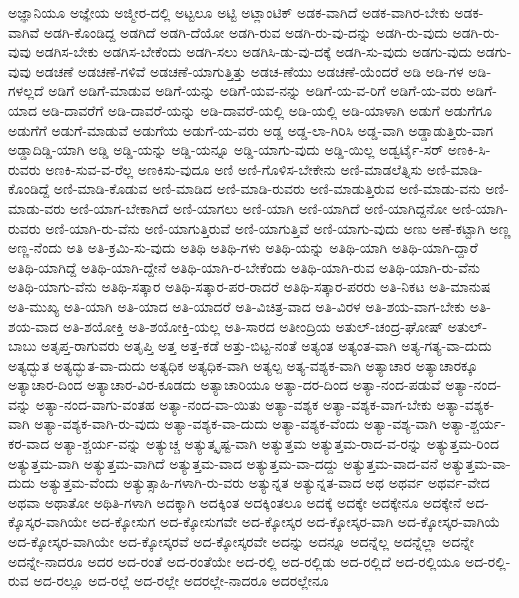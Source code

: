 {ಅಜ್ಞಾನಿಯೂ
ಅಜ್ಞೇಯ
ಅಜ್ಮೀರ-ದಲ್ಲಿ
ಅಟ್ಟಲೂ
ಅಟ್ಟಿ
ಅಟ್ಲಾಂಟಿಕ್
ಅಡಕ-ವಾಗಿದೆ
ಅಡಕ-ವಾಗಿರ-ಬೇಕು
ಅಡಕ-ವಾಗಿವೆ
ಅಡಗಿ-ಕೊಂಡಿದ್ದ
ಅಡಗಿದೆ
ಅಡಗಿ-ದೆಯೋ
ಅಡಗಿ-ರುವ
ಅಡಗಿ-ರು-ವು-ದನ್ನು
ಅಡಗಿ-ರು-ವುದು
ಅಡಗಿ-ರು-ವುವು
ಅಡಗಿಸ-ಬೇಕು
ಅಡಗಿಸ-ಬೇಕೆಂದು
ಅಡಗಿ-ಸಲು
ಅಡಗಿಸಿ-ಡು-ವು-ದಕ್ಕೆ
ಅಡಗಿ-ಸು-ವುದು
ಅಡಗು-ವುದು
ಅಡಗು-ವುವು
ಅಡಚಣೆ
ಅಡಚಣೆ-ಗಳಿವೆ
ಅಡಚಣೆ-ಯಾಗುತ್ತಿತ್ತು
ಅಡಚ-ಣೆಯು
ಅಡಚಣೆ-ಯೆಂದರೆ
ಅಡಿ
ಅಡಿ-ಗಳ
ಅಡಿ-ಗಳಲ್ಲದೆ
ಅಡಿಗೆ
ಅಡಿಗೆ-ಮಾಡುವ
ಅಡಿಗೆ-ಯನ್ನು
ಅಡಿಗೆ-ಯವ-ನನ್ನು
ಅಡಿಗೆ-ಯ-ವ-ರಿಗೆ
ಅಡಿಗೆ-ಯ-ವರು
ಅಡಿಗೆ-ಯಾದ
ಅಡಿ-ದಾವರೆಗೆ
ಅಡಿ-ದಾವರೆ-ಯನ್ನು
ಅಡಿ-ದಾವರೆ-ಯಲ್ಲಿ
ಅಡಿ-ಯಲ್ಲಿ
ಅಡಿ-ಯಾಳಾಗಿ
ಅಡುಗೆ
ಅಡುಗೆಗೂ
ಅಡುಗೆಗೆ
ಅಡುಗೆ-ಮಾಡುವೆ
ಅಡುಗೆಯ
ಅಡುಗೆ-ಯ-ವರು
ಅಡ್ಡ
ಅಡ್ಡ-ಲಾ-ಗಿರಿಸಿ
ಅಡ್ಡ-ವಾಗಿ
ಅಡ್ಡಾಡುತ್ತಿರು-ವಾಗ
ಅಡ್ಡಾದಿಡ್ಡಿ-ಯಾಗಿ
ಅಡ್ಡಿ
ಅಡ್ಡಿ-ಯನ್ನು
ಅಡ್ಡಿ-ಯನ್ನೂ
ಅಡ್ಡಿ-ಯಾಗು-ವುದು
ಅಡ್ಡಿ-ಯಿಲ್ಲ
ಅಡ್ವರ್ಟೈ-ಸರ್
ಅಣಕಿ-ಸಿ-ರುವರು
ಅಣಕಿ-ಸುವ-ವ-ರೆಲ್ಲ
ಅಣಕಿಸು-ವುದೂ
ಅಣಿ
ಅಣಿ-ಗೊಳಿಸ-ಬೇಕೇನು
ಅಣಿ-ಮಾಡಲೆತ್ನಿಸು
ಅಣಿ-ಮಾಡಿ-ಕೊಂಡಿದ್ದೆ
ಅಣಿ-ಮಾಡಿ-ಕೊಡುವ
ಅಣಿ-ಮಾಡಿದ
ಅಣಿ-ಮಾಡಿ-ರುವರು
ಅಣಿ-ಮಾಡುತ್ತಿರುವ
ಅಣಿ-ಮಾಡು-ವನು
ಅಣಿ-ಮಾಡು-ವರು
ಅಣಿ-ಯಾಗ-ಬೇಕಾಗಿದೆ
ಅಣಿ-ಯಾಗಲು
ಅಣಿ-ಯಾಗಿ
ಅಣಿ-ಯಾಗಿದೆ
ಅಣಿ-ಯಾಗಿದ್ದನೋ
ಅಣಿ-ಯಾಗಿ-ರುವರು
ಅಣಿ-ಯಾಗಿ-ರು-ವೆನು
ಅಣಿ-ಯಾಗುತ್ತಿರುವೆ
ಅಣಿ-ಯಾಗುತ್ತಿವೆ
ಅಣಿ-ಯಾಗು-ವುದು
ಅಣು
ಅಣೆ-ಕಟ್ಟಾಗಿ
ಅಣ್ಣ
ಅಣ್ಣ-ನೆಂದು
ಅತಿ
ಅತಿ-ಕ್ರಮಿ-ಸು-ವುದು
ಅತಿಥಿ
ಅತಿಥಿ-ಗಳು
ಅತಿಥಿ-ಯನ್ನು
ಅತಿಥಿ-ಯಾಗಿ
ಅತಿಥಿ-ಯಾಗಿ-ದ್ದಾರೆ
ಅತಿಥಿ-ಯಾಗಿದ್ದೆ
ಅತಿಥಿ-ಯಾಗಿ-ದ್ದೇನೆ
ಅತಿಥಿ-ಯಾಗಿ-ರ-ಬೇಕೆಂದು
ಅತಿಥಿ-ಯಾಗಿ-ರುವ
ಅತಿಥಿ-ಯಾಗಿ-ರು-ವೆನು
ಅತಿಥಿ-ಯಾಗು-ವೆನು
ಅತಿಥಿ-ಸತ್ಕಾರ
ಅತಿಥಿ-ಸತ್ಕಾರ-ಪರ-ರಾದರೆ
ಅತಿಥಿ-ಸತ್ಕಾರ-ಪರರು
ಅತಿ-ನಿಕಟ
ಅತಿ-ಮಾನುಷ
ಅತಿ-ಮುಖ್ಯ
ಅತಿ-ಯಾಗಿ
ಅತಿ-ಯಾದ
ಅತಿ-ಯಾದರೆ
ಅತಿ-ವಿಚಿತ್ರ-ವಾದ
ಅತಿ-ವಿರಳ
ಅತಿ-ಶಯ-ವಾಗ-ಬೇಕು
ಅತಿ-ಶಯ-ವಾದ
ಅತಿ-ಶಯೋಕ್ತಿ
ಅತಿ-ಶಯೋಕ್ತಿ-ಯಲ್ಲ
ಅತಿ-ಸಾರದ
ಅತೀಂದ್ರಿಯ
ಅತುಲ್‌-ಚಂದ್ರ-ಘೋಷ್
ಅತುಲ್‌-ಬಾಬು
ಅತೃಪ್ತ-ರಾಗುವರು
ಅತೃಪ್ತಿ
ಅತ್ತ
ಅತ್ತ-ಕಡೆ
ಅತ್ತು-ಬಿಟ್ಟ-ನಂತೆ
ಅತ್ಯಂತ
ಅತ್ಯಂತ-ವಾಗಿ
ಅತ್ಯ-ಗತ್ಯ-ವಾ-ದುದು
ಅತ್ಯದ್ಭುತ
ಅತ್ಯದ್ಭುತ-ವಾ-ದುದು
ಅತ್ಯಧಿಕ
ಅತ್ಯಧಿಕ-ವಾಗಿ
ಅತ್ಯಲ್ಪ
ಅತ್ಯ-ವಶ್ಯಕ-ವಾಗಿ
ಅತ್ಯಾಚಾರ
ಅತ್ಯಾಚಾರಕ್ಕೂ
ಅತ್ಯಾಚಾರ-ದಿಂದ
ಅತ್ಯಾಚಾರ-ವಿರ-ಕೂಡದು
ಅತ್ಯಾಚಾರಿಯೂ
ಅತ್ಯಾ-ದರ-ದಿಂದ
ಅತ್ಯಾ-ನಂದ-ಪಡುವೆ
ಅತ್ಯಾ-ನಂದ-ವನ್ನು
ಅತ್ಯಾ-ನಂದ-ವಾಗು-ವಂತಹ
ಅತ್ಯಾ-ನಂದ-ವಾ-ಯಿತು
ಅತ್ಯಾ-ವಶ್ಯಕ
ಅತ್ಯಾ-ವಶ್ಯಕ-ವಾಗ-ಬೇಕು
ಅತ್ಯಾ-ವಶ್ಯಕ-ವಾಗಿ
ಅತ್ಯಾ-ವಶ್ಯಕ-ವಾಗಿ-ರು-ವುದು
ಅತ್ಯಾ-ವಶ್ಯಕ-ವಾ-ದುದು
ಅತ್ಯಾ-ವಶ್ಯಕ-ವೆಂದು
ಅತ್ಯಾ-ವಶ್ಯ-ವಾಗಿ
ಅತ್ಯಾ-ಶ್ಚರ್ಯ-ಕರ-ವಾದ
ಅತ್ಯಾ-ಶ್ಚರ್ಯ-ವನ್ನು
ಅತ್ಯುಚ್ಚ
ಅತ್ಯುತ್ಕೃಷ್ಟ-ವಾಗಿ
ಅತ್ಯುತ್ತಮ
ಅತ್ಯುತ್ತಮ-ರಾದ-ವ-ರನ್ನು
ಅತ್ಯುತ್ತಮ-ರಿಂದ
ಅತ್ಯುತ್ತಮ-ವಾಗಿ
ಅತ್ಯುತ್ತಮ-ವಾಗಿದೆ
ಅತ್ಯುತ್ತಮ-ವಾದ
ಅತ್ಯುತ್ತಮ-ವಾ-ದದ್ದು
ಅತ್ಯುತ್ತಮ-ವಾದ-ವನೆ
ಅತ್ಯುತ್ತಮ-ವಾ-ದುದು
ಅತ್ಯುತ್ತಮ-ವೆಂದು
ಅತ್ಯುತ್ಸಾಹಿ-ಗಳಾಗಿ-ರು-ವರು
ಅತ್ಯುನ್ನತ
ಅತ್ಯುನ್ನತ-ವಾದ
ಅಥ
ಅಥರ್ವ
ಅಥರ್ವ-ವೇದ
ಅಥವಾ
ಅಥಾತೋ
ಅಥಿತಿ-ಗಳಾಗಿ
ಅದಕ್ಕಾಗಿ
ಅದಕ್ಕಿಂತ
ಅದಕ್ಕಿಂತಲೂ
ಅದಕ್ಕೆ
ಅದಕ್ಕೇ
ಅದಕ್ಕೇನೂ
ಅದಕ್ಕೇನೆ
ಅದ-ಕ್ಕೊಸ್ಕರ-ವಾಗಿಯೇ
ಅದ-ಕ್ಕೋಸುಗ
ಅದ-ಕ್ಕೋಸುಗವೇ
ಅದ-ಕ್ಕೋಸ್ಕರ
ಅದ-ಕ್ಕೋಸ್ಕರ-ವಾಗಿ
ಅದ-ಕ್ಕೋಸ್ಕರ-ವಾಗಿಯೆ
ಅದ-ಕ್ಕೋಸ್ಕರ-ವಾಗಿಯೇ
ಅದ-ಕ್ಕೋಸ್ಕರವೆ
ಅದ-ಕ್ಕೋಸ್ಕರವೇ
ಅದನ್ನು
ಅದನ್ನೂ
ಅದನ್ನೆಲ್ಲ
ಅದನ್ನೆಲ್ಲಾ
ಅದನ್ನೇ
ಅದನ್ನೇ-ನಾದರೂ
ಅದರ
ಅದ-ರಂತೆ
ಅದ-ರಂತೆಯೇ
ಅದ-ರಲ್ಲಿ
ಅದ-ರಲ್ಲಿಡು
ಅದ-ರಲ್ಲಿದೆ
ಅದ-ರಲ್ಲಿಯೂ
ಅದ-ರಲ್ಲಿ-ರುವ
ಅದ-ರಲ್ಲೂ
ಅದ-ರಲ್ಲೆ
ಅದ-ರಲ್ಲೇ
ಅದರಲ್ಲೇ-ನಾದರೂ
ಅದರಲ್ಲೇನೂ
}
